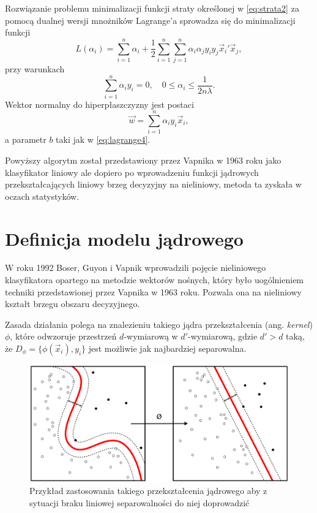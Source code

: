 \documentclass[
]{book}
\theoremstyle{plain}
\theoremstyle{definition}
\theoremstyle{definition}
\theoremstyle{definition}
\theoremstyle{definition}
\theoremstyle{definition}
\theoremstyle{remark}
\begin{document}
Rozwiązanie problemu minimalizacji funkcji straty określonej w \eqref{eq:strata2} za pomocą dualnej wersji mnożników Lagrange'a sprowadza się do minimalizacji funkcji
\begin{equation}
    L(\alpha_i) = \sum_{i=1}^{n}\alpha_i+\frac{1}{2}\sum_{i=1}^{n}\sum_{j=1}^{n}\alpha_i\alpha_jy_iy_j\vec{x}_i'\vec{x}_j,
\label{eq:strata3}  
\end{equation}
przy warunkach
\begin{equation}
    \sum_{i=1}^{n}\alpha_iy_i=0,\quad 0\leq \alpha_i\leq \frac{1}{2n\lambda}.
    \label{eq:nier2}
\end{equation}
Wektor normalny do hiperpłaszczyzny jest postaci
\begin{equation}
    \vec{w}=\sum_{i=1}^{n}\alpha_iy_i\vec{x}_i,
    \label{eq:wagi2}
\end{equation}
a parametr \(b\) taki jak w \eqref{eq:lagrange4}.

Powyższy algorytm został przedstawiony przez Vapnika w 1963 roku jako klasyfikator liniowy ale dopiero po wprowadzeniu funkcji jądrowych przekształcających liniowy brzeg decyzyjny na nieliniowy, metoda ta zyskała w oczach statystyków.

\section{Definicja modelu jądrowego}\label{definicja-modelu-jux105drowego}

W roku 1992 Boser, Guyon i Vapnik wprowadzili pojęcie nieliniowego klasyfikatora opartego na metodzie wektorów nośnych, który było uogólnieniem techniki przedstawionej przez Vapnika w 1963 roku. Pozwala ona na nieliniowy kształt brzegu obszaru decyzyjnego.

Zasada działania polega na znalezieniu takiego jądra przekształcenia (ang. \emph{kernel}) \(\phi\), które odwzoruje przestrzeń \(d\)-wymiarową w \(d'\)-wymiarową, gdzie \(d'>d\) taką, że \(D_{\phi}=\{\phi(\vec{x}_i), y_i\}\) jest możliwie jak najbardziej separowalna.

\begin{figure}

{\centering \includegraphics[width=13.46in]{images/Kernel_Machine} 

}

\caption{Przykład zastosowania takiego przekształcenia jądrowego aby z sytuacji braku liniowej separowalności do niej doprowadzić}\label{fig:svm3}
\end{figure}
\end{document}
